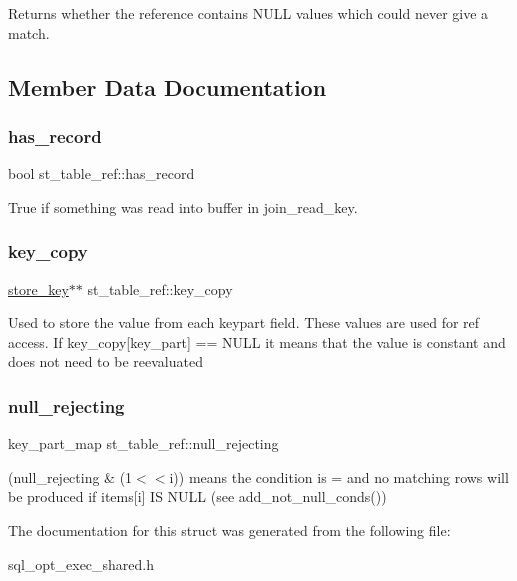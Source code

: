 \begin{DoxyReturn}{Returns}
whether the reference contains N\+U\+LL values which could never give a match. 
\end{DoxyReturn}


\subsection{Member Data Documentation}
\mbox{\label{structst__table__ref_aa3f320b3a7866080d835be500fd35cf5}} 
\subsubsection{\texorpdfstring{has\+\_\+record}{has\_record}}
{\footnotesize\ttfamily bool st\+\_\+table\+\_\+ref\+::has\+\_\+record}

True if something was read into buffer in join\+\_\+read\+\_\+key. \mbox{\label{structst__table__ref_a549bc3dc9bf952366a8d942429a07ffd}} 
\subsubsection{\texorpdfstring{key\+\_\+copy}{key\_copy}}
{\footnotesize\ttfamily \mbox{\hyperlink{classstore__key}{store\+\_\+key}}$\ast$$\ast$ st\+\_\+table\+\_\+ref\+::key\+\_\+copy}

Used to store the value from each keypart field. These values are used for ref access. If key\+\_\+copy\mbox{[}key\+\_\+part\mbox{]} == N\+U\+LL it means that the value is constant and does not need to be reevaluated \mbox{\label{structst__table__ref_a053e50cc2c380377f6b7503b12a8c875}} 
\subsubsection{\texorpdfstring{null\+\_\+rejecting}{null\_rejecting}}
{\footnotesize\ttfamily key\+\_\+part\+\_\+map st\+\_\+table\+\_\+ref\+::null\+\_\+rejecting}

(null\+\_\+rejecting \& (1$<$$<$i)) means the condition is \textquotesingle{}=\textquotesingle{} and no matching rows will be produced if items\mbox{[}i\mbox{]} IS N\+U\+LL (see add\+\_\+not\+\_\+null\+\_\+conds()) 

The documentation for this struct was generated from the following file\+:\begin{DoxyCompactItemize}
\item 
sql\+\_\+opt\+\_\+exec\+\_\+shared.\+h\end{DoxyCompactItemize}
